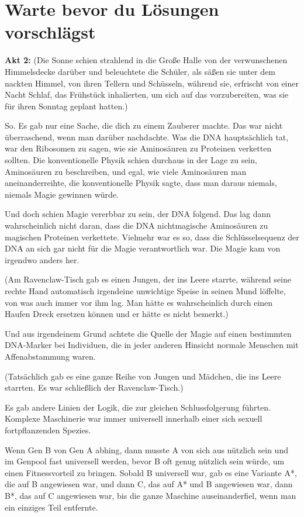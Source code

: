 \chapter{Warte bevor du Lösungen vorschlägst}

\textbf{Akt 2:}
(Die Sonne schien strahlend in die Große Halle von der verwunschenen
Himmelsdecke darüber und beleuchtete die Schüler, als säßen sie unter dem
nackten Himmel, von ihren Tellern und Schüsseln, während sie, erfrischt von
einer Nacht Schlaf, das Frühstück inhalierten, um sich auf das vorzubereiten,
was sie für ihren Sonntag geplant hatten.)

So. Es gab nur eine Sache, die dich zu einem Zauberer machte. Das war nicht
überraschend, wenn man darüber nachdachte. Was die DNA hauptsächlich tat, war
den Ribosomen zu sagen, wie sie Aminosäuren zu Proteinen verketten sollten. Die
konventionelle Physik schien durchaus in der Lage zu sein, Aminosäuren zu
beschreiben, und egal, wie viele Aminosäuren man aneinanderreihte, die
konventionelle Physik sagte, dass man daraus niemals, niemals Magie gewinnen
würde.

Und doch schien Magie vererbbar zu sein, der DNA folgend. Das lag dann
wahrscheinlich nicht daran, dass die DNA nichtmagische Aminosäuren zu magischen
Proteinen verkettete. Vielmehr war es so, dass die Schlüsselsequenz der DNA an
sich gar nicht für die Magie verantwortlich war. Die Magie kam von irgendwo
anders her.

(Am Ravenclaw-Tisch gab es einen Jungen, der ins Leere starrte, während seine
rechte Hand automatisch irgendeine unwichtige Speise in seinen Mund löffelte,
von was auch immer vor ihm lag. Man hätte es wahrscheinlich durch einen Haufen
Dreck ersetzen können und er hätte es nicht bemerkt.)

Und aus irgendeinem Grund achtete die Quelle der Magie auf einen bestimmten
DNA-Marker bei Individuen, die in jeder anderen Hinsicht normale Menschen mit
Affenabstammung waren.

(Tatsächlich gab es eine ganze Reihe von Jungen und Mädchen, die ins Leere
starrten. Es war schließlich der Ravenclaw-Tisch.)

Es gab andere Linien der Logik, die zur gleichen Schlussfolgerung führten.
Komplexe Maschinerie war immer universell innerhalb einer sich sexuell
fortpflanzenden Spezies.

Wenn Gen B von Gen A abhing, dann musste A von sich aus nützlich sein und im
Genpool fast universell werden, bevor B oft genug nützlich sein würde, um einen
Fitnessvorteil zu bringen. Sobald B universell war, gab es eine Variante A*, die
auf B angewiesen war, und dann C, das auf A* und B angewiesen war, dann B*, das
auf C angewiesen war, bis die ganze Maschine auseinanderfiel, wenn man ein
einziges Teil entfernte.

